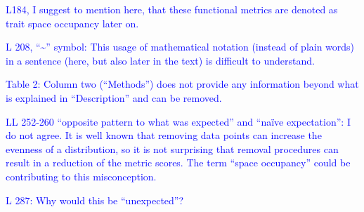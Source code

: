 \documentclass[
]{article}
\begin{document}
\textcolor{blue}{L184, I suggest to mention here, that these functional metrics are denoted as trait space occupancy later on.}

\textcolor{blue}{L 208, ``\textasciitilde{}'' symbol: This usage of mathematical notation (instead of plain words) in a sentence (here, but also later in the text) is difficult to understand.}

\textcolor{blue}{Table 2: Column two (``Methods'') does not provide any information beyond what is explained in ``Description'' and can be removed.}

\textcolor{blue}{LL 252-260 ``opposite pattern to what was expected'' and ``naïve expectation'': I do not agree.
It is well known that removing data points can increase the evenness of a distribution, so it is not surprising that removal procedures can result in a reduction of the metric scores.
The term ``space occupancy'' could be contributing to this misconception.}

\textcolor{blue}{L 287: Why would this be ``unexpected''?}
\end{document}
